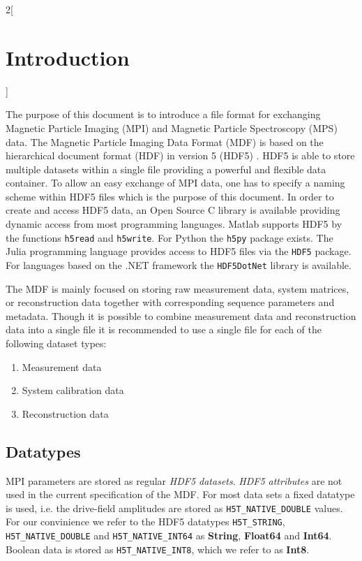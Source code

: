 \documentclass[landscape,a4paper]{article} %
\newcommand{\inl}[1]{\lstinline[columns=fixed]{#1}}
\newcommand{\inltab}[1]{{\ttfamily\bfseries\color{blue}#1}}
\begin{document}
\begin{multicols}{2}[\section{Introduction} \label{Sec:Introduction}]

The purpose of this document is to introduce a file format for exchanging Magnetic Particle Imaging (MPI) and Magnetic Particle Spectroscopy (MPS) data. The Magnetic Particle Imaging Data Format (MDF) is based on the hierarchical document format (HDF) in version 5 (HDF5) \cite{hdf5}. HDF5 is able to store multiple datasets within a single file providing a powerful and flexible data container. To allow an easy exchange of MPI data, one has to specify a naming scheme within HDF5 files which is the purpose of this document. In order to create and access HDF5 data, an Open Source C library is available providing dynamic access from most programming languages. Matlab supports HDF5 by the functions \inl{h5read} and \inl{h5write}. For Python the \inl{h5py} package exists. The Julia programming language provides access to HDF5 files via the \inl{HDF5} package. For languages based on the .NET framework the \inl{HDF5DotNet} library is available.

The MDF is mainly focused on storing raw measurement data, system matrices, or reconstruction data together with corresponding sequence parameters and metadata. Though it is possible to combine measurement data and reconstruction data into a single file it is recommended to use a single file for each of the following dataset types:
\begin{enumerate}
\setlength{\itemsep}{0pt}
\item Measurement data
\item System calibration data
\item Reconstruction data
\end{enumerate}

\subsection{Datatypes}

MPI parameters are stored as regular \textit{HDF5 datasets}. \textit{HDF5 attributes} are not used in the current specification of the MDF. For most data sets a fixed datatype is used, i.e. the drive-field amplitudes are stored as \inl{H5T_NATIVE_DOUBLE} values. For our convinience we refer to the HDF5 datatypes \inl{H5T_STRING}, \inl{H5T_NATIVE_DOUBLE} and \inl{H5T_NATIVE_INT64} as \inltab{String}, \inltab{Float64} and \inltab{Int64}. Boolean data is stored as \inl{H5T_NATIVE_INT8}, which we refer to as \inltab{Int8}.


\end{multicols}
\end{document}

